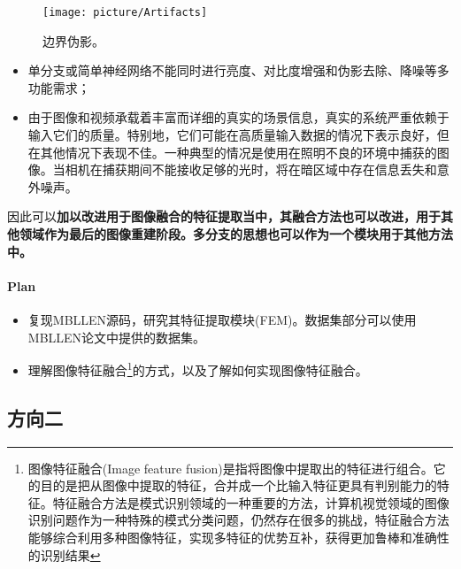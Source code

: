 \documentclass[letterpaper,10pt]{article}
\begin{document}
		\begin{figure}[htbp]
			\centering 
			\texttt{[image: picture/Artifacts]}
			\caption{
				\label{fig: Ringing Artifacts} 
				边界伪影。
			}
		\end{figure}
		
		\begin{itemize}
			\item{}
			单分支或简单神经网络不能同时进行亮度、对比度增强和伪影去除、降噪等多功能需求；
			\item{}
			由于图像和视频承载着丰富而详细的真实的场景信息，真实的系统严重依赖于输入它们的质量。特别地，它们可能在高质量输入数据的情况下表示良好，但在其他情况下表现不佳。一种典型的情况是使用在照明不良的环境中捕获的图像。当相机在捕获期间不能接收足够的光时，将在暗区域中存在信息丢失和意外噪声。
		\end{itemize}
	
		因此可以\textbf {\color{red}{仔细研究其特征提取模块(FEM)}加以改进用于图像融合的特征提取当中，其融合方法也可以改进，用于其他领域作为最后的图像重建阶段。多分支的思想也可以作为一个模块用于其他方法中。}
		
		\paragraph{Plan}
		
		\begin{itemize}
			\item[ 1)]
			复现MBLLEN源码，研究其特征提取模块(FEM)。数据集部分可以使用MBLLEN论文中提供的数据集。
			\item[ 2)]
			理解图像特征融合\footnote{图像特征融合(Image feature fusion)是指将图像中提取出的特征进行组合。它的目的是把从图像中提取的特征，合并成一个比输入特征更具有判别能力的特征。特征融合方法是模式识别领域的一种重要的方法，计算机视觉领域的图像识别问题作为一种特殊的模式分类问题，仍然存在很多的挑战，特征融合方法能够综合利用多种图像特征，实现多特征的优势互补，获得更加鲁棒和准确性的识别结果}的方式，以及了解如何实现图像特征融合。
		\end{itemize}
	
		\subsection{方向二}
	
		
	
	
\end{document}
